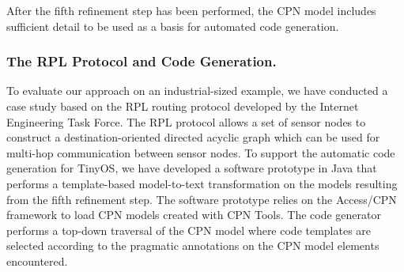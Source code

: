 \documentclass[a4paper]{llncs}
\begin{document}
\noindent
After the fifth refinement step has been performed, the CPN model
includes sufficient detail to be used as a basis for automated code
generation.
 
\vspace*{-0.75em}
\subsubsection{The RPL Protocol and Code Generation.}

To evaluate our approach on an industrial-sized example, we have
conducted a case study based on the RPL routing protocol
\cite{rplprotocol} developed by the Internet Engineering Task
Force. The RPL protocol allows a set of sensor nodes to construct a
destination-oriented directed acyclic graph which can be used for
multi-hop communication between sensor nodes.  To support the
automatic code generation for TinyOS, we have developed a software
prototype in Java that performs a template-based model-to-text
transformation on the models resulting from the fifth refinement
step. The software prototype relies on the Access/CPN framework
\cite{accesscpn} to load CPN models created with CPN Tools. The code
generator performs a top-down traversal of the CPN model where code
templates are selected according to the pragmatic annotations on the
CPN model elements encountered.






\end{document}
